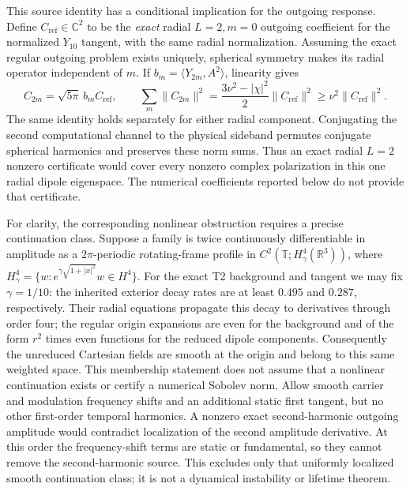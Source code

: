 This source identity has a conditional implication for the outgoing
response. Define $C_{\mathrm{ref}}\in\mathbb C^2$ to be the \emph{exact}
radial $L=2,m=0$ outgoing coefficient for the normalized $Y_{10}$ tangent,
with the same radial normalization. Assuming the exact regular outgoing
problem exists uniquely, spherical symmetry makes its radial operator
independent of $m$. If $b_m=\langle Y_{2m},A^2\rangle$, linearity gives
\begin{equation}
 C_{2m}=\sqrt{5\pi}\,b_m C_{\mathrm{ref}},\qquad
 \sum_m\|C_{2m}\|^2
 =\frac{3\nu^2-|\chi|^2}{2}\|C_{\mathrm{ref}}\|^2
 \geq\nu^2\|C_{\mathrm{ref}}\|^2.
 \label{nl:polarization-response}
\end{equation}
The same identity holds separately for either radial component.
Conjugating the second computational channel to the physical sideband
permutes conjugate spherical harmonics and preserves these norm sums.
Thus an exact radial $L=2$ nonzero certificate would cover every nonzero
complex polarization in this one radial dipole eigenspace. The numerical
coefficients reported below do not provide that certificate.

For clarity, the corresponding nonlinear obstruction requires a precise
continuation class. Suppose a family is twice continuously differentiable
in amplitude as a $2\pi$-periodic rotating-frame profile in
$C^2(\mathbb T;H^4_\gamma(\mathbb R^3))$, where
$H^4_\gamma=\{w:e^{\gamma\sqrt{1+|x|^2}}w\in H^4\}$.
For the exact T2 background and tangent we may fix $\gamma=1/10$:
the inherited exterior decay rates are at least $0.495$ and $0.287$,
respectively. Their radial equations propagate this decay to derivatives
through order four; the regular origin expansions are even for the
background and of the form $r^2$ times even functions for the reduced
dipole components. Consequently the unreduced Cartesian fields are
smooth at the origin and belong to this same weighted space.
This membership statement does not assume that a nonlinear continuation
exists or certify a numerical Sobolev norm. Allow smooth
carrier and modulation frequency shifts and an additional static first
tangent, but no other first-order temporal harmonics. A nonzero exact
second-harmonic outgoing amplitude would contradict localization of the
second amplitude derivative. At this order the frequency-shift terms
are static or fundamental, so they cannot remove the second-harmonic
source. This excludes only that uniformly localized smooth continuation
class; it is not a dynamical instability or lifetime theorem.

